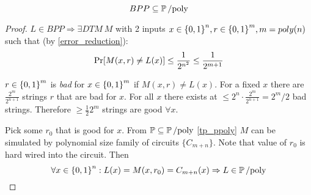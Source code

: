 \begin{theorem}
	\[ BPP \subseteq \operatorname{\operatorname{\mathbb{P}}/poly} \]
\end{theorem}
\begin{proof}
	$L \in BPP \Rightarrow \exists DTM\ M$ with 2 inputs $x \in \operatorname{\{ 0, 1 \}}^n, r \in \operatorname{\{ 0, 1 \}}^m, m = poly(n)$ such that (by \cref{error_reduction}):
	\[ \operatorname{Pr}[M(x, r) \neq L(x)] \leq \frac{1}{2^{n^2}} \leq \frac{1}{2^{m + 1}} \]

	$r \in \operatorname{\{ 0, 1 \}}^m$ is \emph{bad} for $x \in \operatorname{\{ 0, 1 \}}^m$ if $M(x, r) \neq L(x)$.
	For a fixed $x$ there are $\frac{2^m}{2^{n + 1}}$ strings $r$ that are bad for $x$.
	For all $x$ there exists at $\leq 2^n \cdot \frac{2^m}{2^{n + 1}} = 2^m/2$ bad strings.
	Therefore $\geq \frac{1}{2} 2^m$ strings are good $\forall x$.

	Pick some $r_0$ that is good for $x$.
	From $\operatorname{\mathbb{P}} \subseteq \operatorname{\operatorname{\mathbb{P}}/poly}$ \cref{tp_ppoly} $M$ can be simulated by polynomial size family of circuits $\{ C_{m + n} \}$.
	Note that value of $r_0$ is hard wired into the circuit.
	Then
	\[ \forall x \in \operatorname{\{ 0, 1 \}}^n: L(x) = M(x, r_0) = C_{m + n}(x) \Rightarrow L \in \operatorname{\operatorname{\mathbb{P}}/poly} \]
\end{proof}

